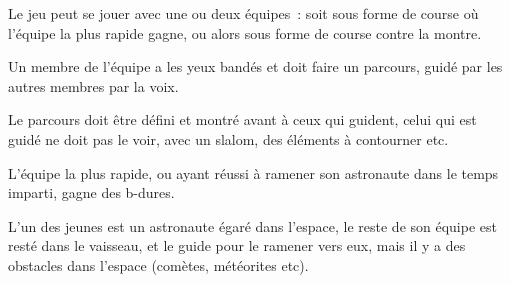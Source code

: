 \documentclass{grand-jeu}
\begin{document}
\begin{liste-materiel}
\end{liste-materiel}

\begin{regles}
Le jeu peut se jouer avec une ou deux équipes : soit sous forme de course où l’équipe la plus rapide gagne, ou alors sous forme de course contre la montre.

Un membre de l’équipe a les yeux bandés et doit faire un parcours, guidé par les autres membres par la voix.

Le parcours doit être défini et montré avant à ceux qui guident, celui qui est guidé ne doit pas le voir, avec un slalom, des éléments à contourner etc.

L’équipe la plus rapide, ou ayant réussi à ramener son astronaute dans le temps imparti, gagne des b-dures.
\end{regles}

\begin{imaginaire}
L’un des jeunes est un astronaute égaré dans l’espace, le reste de son équipe est resté dans le vaisseau, et le guide pour le ramener vers eux, mais il y a des obstacles dans l’espace (comètes, météorites etc).
\end{imaginaire}

\begin{moments-stop}
\end{moments-stop}
\end{document}
